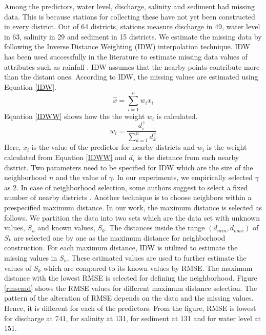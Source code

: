 \documentclass[preprint,review,12pt]{elsarticle}
\begin{document}

Among the predictors, water level, discharge, salinity and sediment had missing data. This is because stations for collecting these have not yet been constructed in every district. Out of 64 districts, stations measure discharge in 49, water level in 63, salinity in 29 and sediment in 15 districts. We estimate the missing data by following the Inverse Distance Weighting (IDW) interpolation technique. IDW has been used successfully in the literature to estimate missing data values of attributes such as rainfall \cite{chen2012estimation}. IDW assumes that the nearby points contribute more than the distant ones. According to IDW, the missing values are estimated using Equation \ref{IDW}.   
\begin{equation} \label{IDW}
\hat{x}=\sum_{i=1}^{n} w_{i}x_{i}
\end{equation}
Equation \ref{IDWW} shows how the the weight $w_{i}$ is calculated. 
\begin{equation} \label{IDWW}
w_{i}= \frac{d^{\gamma}_{i}}{\sum_{k=1}^{n} d^{\gamma}_{k}}
\end{equation}
Here, $x_{i}$ is the value of the predictor for nearby districts and $w_{i}$ is the weight calculated from Equation \ref{IDWW} and $d_{i}$ is the distance from each nearby district. Two parameters need to be specified for IDW which are the size of the neighborhood $n$ and the value of $\gamma$. In our experiments, we empirically selected $\gamma$ as 2. In case of neighborhood selection, some authors suggest to select a fixed number of nearby districts \cite{zimmerman1999experimental}. Another technique is to choose neighbors within a prespecified maximum distance. In our work, the maximum distance is selected as follows. We partition the data into two sets which are the data set with unknown values, $S_{u}$ and known values, $S_{k}$. The distances inside the range $(d_{min},d_{max})$ of $S_{k}$ are selected one by one as the maximum distance for neighborhood construction. For each maximum distance, IDW is utilized to estimate the missing values in $S_{u}$. These estimated values are used to further estimate the values of $S_{k}$ which are compared to its known values by RMSE. The maximum distance with the lowest RMSE is selected for defining the neighborhood. Figure \ref{rmsemd} shows the RMSE values for different maximum distance selection. The pattern of the alteration of RMSE depends on the data and the missing values. Hence, it is different for each of the predictors. From the figure, RMSE is lowest for discharge at 741, for salinity at 131, for sediment at 131 and for water level at 151.     
\end{document}
